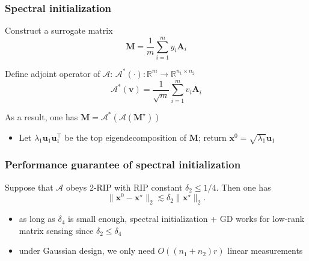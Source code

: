 \documentclass[compress,
mathserif,wide,%
]{beamer}
\begin{document}
\begin{frame}
	\frametitle{Spectral initialization}
	Construct a surrogate matrix
	\[
	\bm{M} = \frac{1}{m} \sum_{i=1}^{m} y_i \bm{A}_{i}
	\]
	
	Define adjoint operator of $\mathcal{A}$: $\mathcal{A}^*(\cdot) : \mathbb{R}^{m} \to \mathbb{R}^{n_1 \times n_2}$
	\[
	\mathcal{A}^*(\bm{v}) = \frac{1}{ \sqrt{m} }\sum_{i=1}^{m} v_i \bm{A}_{i}
	\]
	
	As a result, one has $\bm{M} = \mathcal{A}^*( \mathcal{A} (\bm{M}^\star) )$ \\
	
	\vfill
	\begin{itemize}
		\item Let $\lambda_{1} \bm{u}_1 \bm{u}_{1}^\top$ be the top eigendecomposition of $\bm{M}$; return $\bm{x}^0 = \sqrt{\lambda_{1}} \bm{u}_1$
	\end{itemize}
\end{frame}

\begin{frame}
	\frametitle{Performance guarantee of spectral initialization}
	\begin{lemma}\label{lemma:spectral-matrix-sensing}
		Suppose that $\mathcal{A}$ obeys 2-RIP with RIP constant $\delta_{2} \leq 1/4$. Then one has 
		\[
		\| \bm{x}^0 - \bm{x}^\star \|_2 \lesssim \delta_{2} \|\bm{x}^\star\|_{2}.
		\]
	\end{lemma}
	
	\vfill
	\begin{itemize}
		\item as long as $\delta_{4}$ is small enough, spectral initialization + GD works for low-rank matrix sensing since $\delta_{2} \leq \delta_{4}$
		\item under Gaussian design, we only need $O((n_1 + n_2)r)$ linear measurements
	\end{itemize}
\end{frame}
\end{document}
